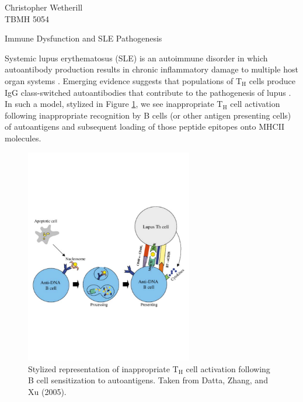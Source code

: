 \documentclass[11pt,letterpaper,final] {article}
\newcommand{\sub}[1]{\ensuremath{_{\text{#1}}}}
\begin{document}

\noindent Christopher Wetherill\\
TBMH 5054\\

\begin{center}
Immune Dysfunction and SLE Pathogenesis
\end{center}

Systemic lupus erythematosus (SLE) is an autoimmune disorder in which autoantibody production results in chronic inflammatory damage to multiple host organ systems \cite{Dong:2011}. Emerging evidence suggests that populations of T\sub{H} cells produce IgG class-switched autoantibodies that contribute to the pathogenesis of lupus \cite{Datta:2005}. In such a model, stylized in Figure \ref{fig:01}, we see inappropriate T\sub{H} cell activation following inappropriate recognition by B cells (or other antigen presenting cells) of autoantigens and subsequent loading of those peptide epitopes onto MHCII molecules.

\begin{figure}[htp]
  \centering
    \includegraphics[width=0.65\textwidth]{sensitization}
	\caption{Stylized representation of inappropriate T\sub{H} cell activation following B cell sensitization to autoantigens. Taken from Datta, Zhang, and Xu (2005).}
	\label{fig:01}
\end{figure}
\end{document}
